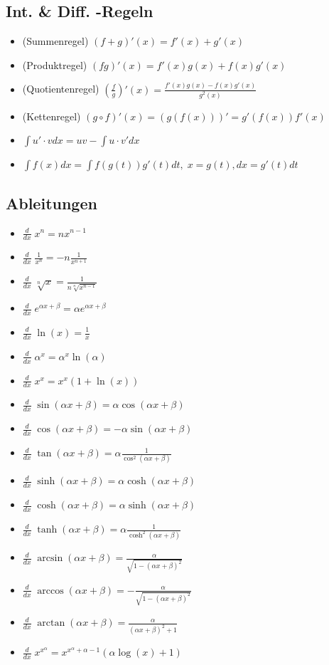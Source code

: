 
\subsection{Int. \& Diff. -Regeln}
\begin{itemize}[leftmargin=*]
	\item (Summenregel) $(f + g)'(x) = f'(x) + g'(x)$
	\item (Produktregel) $(fg)'(x) = f'(x)g(x) + f(x)g'(x)$
	\item (Quotientenregel) $(\frac{f}{g})'(x) = \frac{f'(x)g(x) -
	f(x)g'(x)}{g^2(x)}$
	\item (Kettenregel) $(g \circ f)'(x) = (g(f(x)))' = g'(f(x)) f'(x)$
	\item $\int u'\cdot v dx = uv - \int u \cdot v' dx$
	\item $\int f(x) dx = \int f(g(t)) g'(t) dt, \; x=g(t), dx = g'(t) dt$
\end{itemize}

\subsection{Ableitungen}
\begin{itemize}[leftmargin=*]
	\item $\frac{d}{dx}\; x^n = nx^{n-1}$
	\item $\frac{d}{dx}\; \frac{1}{x^n} = -n \frac{1}{x^{n+1}}$
	\item $\frac{d}{dx}\; \sqrt[n]{x} = \frac{1}{n\sqrt[n]{x^{n-1}}}$
	\item $\frac{d}{dx}\; e^{\alpha x + \beta} = \alpha e^{\alpha x + \beta}$
	\item $\frac{d}{dx}\; \ln(x) = \frac{1}{x}$
	\item $\frac{d}{dx}\; \alpha^x = \alpha^x \ln(\alpha)$
	\item $\frac{d}{dx}\; x^x = x^x (1 + \ln(x))$
	\item $\frac{d}{dx}\; \sin(\alpha x + \beta) = \alpha \cos(\alpha x + \beta)$
	\item $\frac{d}{dx}\; \cos(\alpha x + \beta) = -\alpha \sin(\alpha x + \beta)$
	\item $\frac{d}{dx}\; \tan(\alpha x + \beta) = \alpha \frac{1}{\cos^2(\alpha x
	+ \beta)}$
	\item $\frac{d}{dx}\; \sinh(\alpha x + \beta) = \alpha \cosh(\alpha x + \beta)$
	\item $\frac{d}{dx}\; \cosh(\alpha x + \beta) = \alpha \sinh(\alpha x + \beta)$
	\item $\frac{d}{dx}\; \tanh(\alpha x + \beta) = \alpha
	\frac{1}{\cosh^2(\alpha x + \beta)}$
	\item $\frac{d}{dx}\; \arcsin(\alpha x + \beta) =
	\frac{\alpha}{\sqrt{1-(\alpha x + \beta)^2}}$
	\item $\frac{d}{dx}\; \arccos(\alpha x + \beta) = -\frac{\alpha}{\sqrt{1 -
	(\alpha x + \beta)^2}}$
	\item $\frac{d}{dx}\; \arctan(\alpha x + \beta) = \frac{\alpha}{(\alpha x +
	\beta)^2 + 1}$
	\item $\frac{d}{dx}\; x^{x^\alpha} = x^{x^\alpha + \alpha - 1} (\alpha
	\log(x) + 1)$
\end{itemize}

